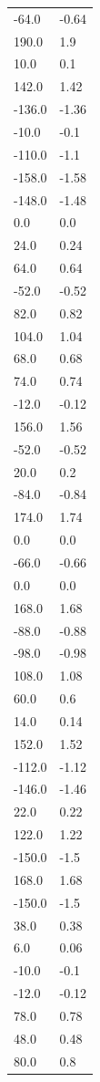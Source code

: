 \begin{longtable}{ll}
-64.0 & -0.64 \\
190.0 & 1.9 \\
10.0 & 0.1 \\
142.0 & 1.42 \\
-136.0 & -1.36 \\
-10.0 & -0.1 \\
-110.0 & -1.1 \\
-158.0 & -1.58 \\
-148.0 & -1.48 \\
0.0 & 0.0 \\
24.0 & 0.24 \\
64.0 & 0.64 \\
-52.0 & -0.52 \\
82.0 & 0.82 \\
104.0 & 1.04 \\
68.0 & 0.68 \\
74.0 & 0.74 \\
-12.0 & -0.12 \\
156.0 & 1.56 \\
-52.0 & -0.52 \\
20.0 & 0.2 \\
-84.0 & -0.84 \\
174.0 & 1.74 \\
0.0 & 0.0 \\
-66.0 & -0.66 \\
0.0 & 0.0 \\
168.0 & 1.68 \\
-88.0 & -0.88 \\
-98.0 & -0.98 \\
108.0 & 1.08 \\
60.0 & 0.6 \\
14.0 & 0.14 \\
152.0 & 1.52 \\
-112.0 & -1.12 \\
-146.0 & -1.46 \\
22.0 & 0.22 \\
122.0 & 1.22 \\
-150.0 & -1.5 \\
168.0 & 1.68 \\
-150.0 & -1.5 \\
38.0 & 0.38 \\
6.0 & 0.06 \\
-10.0 & -0.1 \\
-12.0 & -0.12 \\
78.0 & 0.78 \\
48.0 & 0.48 \\
80.0 & 0.8 \\

\end{longtable}
